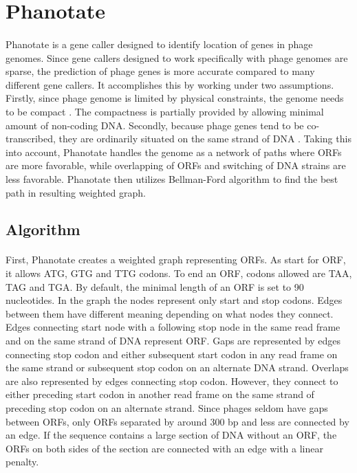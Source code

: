 \section{Phanotate}
\paragraph*{}
Phanotate\cite{mcnair2019phanotate} is a gene caller designed to identify location of genes in phage genomes. Since gene callers designed to work specifically with phage genomes are sparse, the prediction of phage genes is more accurate compared to many different gene callers. It accomplishes this by working under two assumptions. Firstly, since phage genome is limited by physical constraints, the genome needs to be compact \cite{kang2017prophage}. The compactness is partially provided by allowing minimal amount of non-coding DNA. Secondly, because phage genes tend to be co-transcribed, they are ordinarily situated on the same strand of DNA \cite{akhter2012phispy}. Taking this into account, Phanotate handles the genome as a network of paths where ORFs are more favorable, while overlapping of ORFs and switching of DNA strains are less favorable. Phanotate then utilizes Bellman-Ford algorithm to find the best path in resulting weighted graph.

\subsection{Algorithm}
\paragraph*{}
First, Phanotate creates a weighted graph representing ORFs. As start for ORF, it allows ATG, GTG and TTG codons. To end an ORF, codons allowed are TAA, TAG and TGA. By default, the minimal length of an ORF is set to 90 nucleotides. In the graph the nodes represent only start and stop codons. Edges between them have different meaning depending on what nodes they connect. Edges connecting start node with a following stop node in the same read frame and on the same strand of DNA represent ORF. Gaps are represented by edges connecting stop codon and either subsequent start codon in any read frame on the same strand or subsequent stop codon on an alternate DNA strand. Overlaps are also represented by edges connecting stop codon. However, they connect to either preceding start codon in another read frame on the same strand of preceding stop codon on an alternate strand. Since phages seldom have gaps between ORFs, only ORFs separated by around 300 bp and less are connected by an edge. If the sequence contains a large section of DNA without an ORF, the ORFs on both sides of the section are connected with an edge with a linear penalty.
